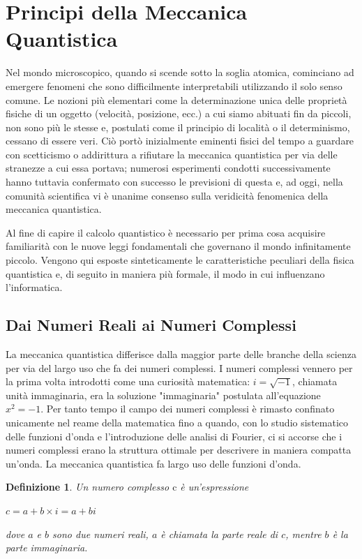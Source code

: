 \documentclass[12pt,a4paper,openright]{report}
\newtheorem{mydef}{Definizione}[chapter]
\begin{document}
\section{Principi della Meccanica Quantistica}
Nel mondo microscopico, quando si scende sotto la soglia atomica, cominciano ad emergere fenomeni che sono difficilmente interpretabili utilizzando il solo senso comune.
Le nozioni più elementari come la determinazione unica delle proprietà fisiche di un oggetto (velocità, posizione, ecc.) a cui siamo abituati fin da piccoli, non sono più le stesse e,
postulati come il principio di località o il determinismo, cessano di essere veri.
Ciò portò inizialmente eminenti fisici del tempo a guardare con scetticismo o addirittura a rifiutare la meccanica quantistica per via delle stranezze a cui essa portava;
numerosi esperimenti condotti successivamente hanno tuttavia confermato con successo le previsioni di questa e, ad oggi, nella comunità scientifica vi è unanime consenso sulla veridicità fenomenica della meccanica quantistica.\par
Al fine di capire il calcolo quantistico è necessario per prima cosa acquisire familiarità con le nuove leggi fondamentali che governano il mondo infinitamente piccolo.
Vengono qui esposte sinteticamente le caratteristiche peculiari della fisica quantistica e, di seguito in maniera più formale, il modo in cui influenzano l'informatica.

\subsection{Dai Numeri Reali ai Numeri Complessi}
La meccanica quantistica differisce dalla maggior parte delle branche della scienza per via del largo uso che fa dei numeri complessi.
I numeri complessi vennero per la prima volta introdotti come una curiosità matematica: $i=\sqrt{-1}$, chiamata unità immaginaria, era la soluzione "immaginaria" postulata
all'equazione $x^2=-1$. Per tanto tempo il campo dei numeri complessi è rimasto confinato unicamente nel reame della matematica fino a quando,
con lo studio sistematico delle funzioni d'onda e l'introduzione delle analisi di Fourier, ci si accorse che i numeri complessi erano la struttura
ottimale per descrivere in maniera compatta un'onda. La meccanica quantistica fa largo uso delle funzioni d'onda.\par
\begin{mydef}
    Un numero complesso $\text{c}$ è un'espressione
    \begin{center}
        $c = a + b \times i = a + bi$\\
    \end{center}
        dove $a$ e $b$ sono due numeri reali, $a$ è chiamata la parte reale di $c$, mentre $b$ è la parte immaginaria.
    
\end{mydef}
\end{document}
